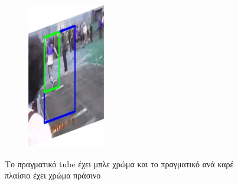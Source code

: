 \documentclass{report}
\begin{document}
\begin{figure}[h]
\begin{subfigure}{0.15\textwidth}
    \includegraphics[width=\textwidth]{output/img_15.jpg}
  \end{subfigure}
  \caption{Το πραγματικό tube έχει μπλε χρώμα και το πραγματικό ανά καρέ πλαίσιο έχει χρώμα πράσινο}
  \label{fig:gt_tubes_and_rois}
\end{figure}
\end{document}

